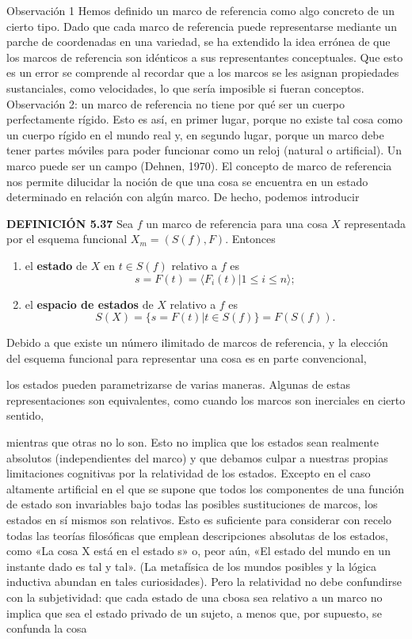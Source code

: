 \begin{justifying}
  \bigskip

  Observación 1 Hemos definido un marco de referencia como algo concreto de un
  cierto tipo. Dado que cada marco de referencia puede representarse mediante un
  parche de coordenadas en una variedad, se ha extendido la idea errónea de que
  los marcos de referencia son idénticos a sus representantes conceptuales.
  Que esto es un error se comprende al recordar que a los marcos se les asignan
  propiedades sustanciales, como velocidades, lo que sería imposible si
  fueran conceptos. Observación 2: un marco de referencia no tiene por qué ser un
  cuerpo perfectamente rígido. Esto es así, en primer lugar, porque no existe tal cosa como un
  cuerpo rígido en el mundo real y, en segundo lugar, porque un marco debe tener
  partes móviles para poder funcionar como un reloj (natural o artificial). Un
  marco puede ser un campo (Dehnen, 1970).
  El concepto de marco de referencia nos permite dilucidar la noción de que una
  cosa se encuentra en un estado determinado en relación con algún marco. De hecho, podemos
  introducir

      \bigskip
      
    \noindent\textbf{DEFINICIÓN 5.37} Sea $f$ un marco de referencia para una cosa $X$ representada por el esquema funcional $X_m = (S(f), F)$. Entonces
    \begin{enumerate}
        \item[(i)] el \textbf{estado} de $X$ en $t \in S(f)$ relativo a $f$ es
        $$ s = F(t) = \langle F_i(t) | 1 \le i \le n \rangle; $$

        \item[(ii)] el \textbf{espacio de estados} de $X$ relativo a $f$ es
        $$ S(X) = \{s = F(t) | t \in S(f)\} = F(S(f)). $$
    \end{enumerate}
  \bigskip
  Debido a que existe un número ilimitado de marcos de referencia, y la
  elección del esquema funcional para representar una cosa es en parte convencional,

  los estados pueden parametrizarse de varias maneras. Algunas de estas representaciones
  son equivalentes, como cuando los marcos son inerciales en cierto sentido,

  mientras que otras no lo son. Esto no implica que los estados sean realmente absolutos
  (independientes del marco) y que debamos culpar a nuestras propias limitaciones cognitivas
  por la relatividad de los estados. Excepto en el caso altamente artificial
  en el que se supone que todos los componentes de una función de estado son invariables
  bajo todas las posibles sustituciones de marcos, los estados en sí mismos son relativos.
  Esto es suficiente para considerar con recelo todas las teorías filosóficas
  que emplean descripciones absolutas de los estados, como «La cosa X está en el estado s»
  o, peor aún, «El estado del mundo en un instante dado es tal y tal».
  (La metafísica de los mundos posibles y la lógica inductiva abundan en tales
  curiosidades). Pero la relatividad no debe confundirse con la subjetividad: que
  cada estado de una cbosa sea relativo a un marco no implica que sea el
  estado privado de un sujeto, a menos que, por supuesto, se confunda la cosa


\end{justifying}

